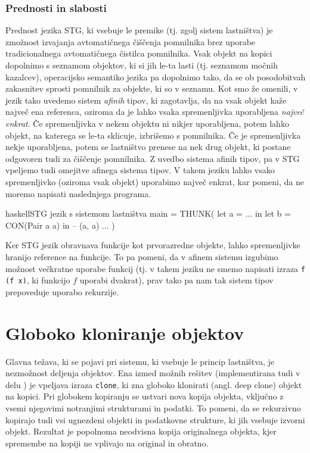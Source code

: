 \subsubsection{Prednosti in slabosti}

Prednost jezika STG, ki vsebuje le premike (tj. zgolj sistem lastništva) je zmožnost izvajanja avtomatičnega čiščenja pomnilnika brez uporabe tradicionalnega avtomatičnega čistilca pomnilnika. Vsak objekt na kopici dopolnimo s seznamom objektov, ki si jih le-ta lasti (tj. seznamom močnih kazalcev), operacijsko semantiko jezika pa dopolnimo tako, da se ob posodobitvah zakasnitev sprosti pomnilnik za objekte, ki so v seznamu. Kot smo že omenili, v jezik tako uvedemo sistem \emph{afinih} tipov, ki zagotavlja, da na vsak objekt kaže največ ena referenca, oziroma da je lahko vsaka spremenljivka uporabljena \emph{največ enkrat}. Če spremenljivka v nekem objektu ni nikjer uporabljena, potem lahko objekt, na katerega se le-ta sklicuje, izbrišemo s pomnilnika. Če je spremenljivka nekje uporabljena, potem se lastništvo prenese na nek drug objekt, ki postane odgovoren tudi za čiščenje pomnilnika. Z uvedbo sistema afinih tipov, pa v STG vpeljemo tudi omejitve afinega sistema tipov. V takem jeziku lahko vsako spremenljivko (oziroma vsak objekt) uporabimo največ enkrat, kar pomeni, da ne moremo napisati naslednjega programa.

\begin{code-box}{haskell}{STG jezik s sistemom lastništva \xmark}
main = THUNK(
    let a = ... in
    let b = CON(Pair a a) in -- (a, a)
        ...
)
\end{code-box}

Ker STG jezik obravnava funkcije kot prvorazredne objekte, lahko spremenljivke hranijo reference na funkcije. To pa pomeni, da v afinem sistemu izgubimo možnost večkratne uporabe funkcij (tj. v takem jeziku ne smemo napisati izraza \texttt{f (f x)}, ki funkcijo $f$ uporabi dvakrat), prav tako pa nam tak sistem tipov prepoveduje uporabo rekurzije. 


\section{Globoko kloniranje objektov}

Glavna težava, ki se pojavi pri sistemu, ki vsebuje le princip lastništva, je nezmožnost deljenja objektov. Ena izmed možnih rešitev (implementirana tudi v delu \cite{marshall2024functional}) je vpeljava izraza \texttt{clone}, ki zna globoko klonirati (angl. deep clone) objekt na kopici. Pri globokem kopiranju se ustvari nova kopija objekta, vključno z vsemi njegovimi notranjimi strukturami in podatki. To pomeni, da se rekurzivno kopirajo tudi vsi ugnezdeni objekti in podatkovne strukture, ki jih vsebuje izvorni objekt. Rezultat je popolnoma neodvisna kopija originalnega objekta, kjer spremembe na kopiji ne vplivajo na original in obratno.

